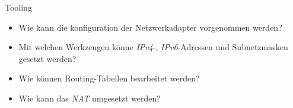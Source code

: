 \documentclass[xcolor=dvipsnames, aspectratio=169]{beamer}
\begin{document}
\begin{frame}{Tooling}
	\begin{itemize}
		\item Wie kann die konfiguration der Netzwerkadapter vorgenommen werden?
		\item Mit welchen Werkzeugen könne \emph{IPv4}-, \emph{IPv6}-Adressen und Subnetzmasken gesetzt werden?
		\item Wie können Routing-Tabellen bearbeitet werden?
		\item Wie kann das \emph{NAT} umgesetzt werden?
	\end{itemize}
\end{frame}
\end{document}
